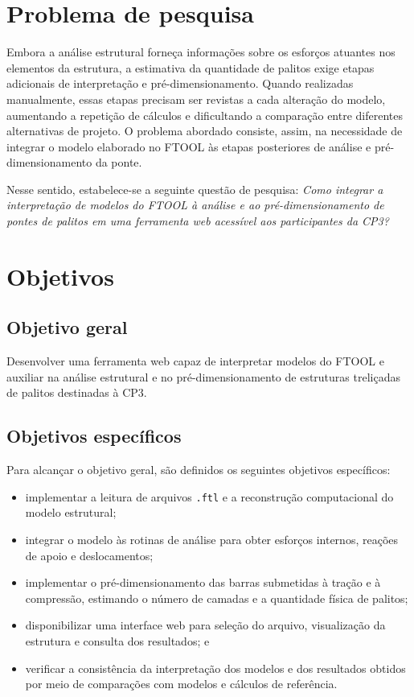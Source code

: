\section{Problema de pesquisa}
\label{sec:problema-pesquisa}

Embora a análise estrutural forneça informações sobre os esforços atuantes nos elementos da estrutura, a estimativa da quantidade de palitos exige etapas adicionais de interpretação e pré-dimensionamento. Quando realizadas manualmente, essas etapas precisam ser revistas a cada alteração do modelo, aumentando a repetição de cálculos e dificultando a comparação entre diferentes alternativas de projeto. O problema abordado consiste, assim, na necessidade de integrar o modelo elaborado no \gls{FTOOL} às etapas posteriores de análise e pré-dimensionamento da ponte.

Nesse sentido, estabelece-se a seguinte questão de pesquisa: \textit{Como integrar a interpretação de modelos do \gls{FTOOL} à análise e ao pré-dimensionamento de pontes de palitos em uma ferramenta web acessível aos participantes da \gls{CP3}?}

\section{Objetivos}
\label{sec:objetivos}

\subsection{Objetivo geral}
\label{subsec:objetivo-geral}

Desenvolver uma ferramenta web capaz de interpretar modelos do \gls{FTOOL} e auxiliar na análise estrutural e no pré-dimensionamento de estruturas treliçadas de palitos destinadas à \gls{CP3}.

\subsection{Objetivos específicos}
\label{subsec:objetivos-especificos}

Para alcançar o objetivo geral, são definidos os seguintes objetivos específicos:

\begin{itemize}
    \item implementar a leitura de arquivos \texttt{.ftl} e a reconstrução computacional do modelo estrutural;
    \item integrar o modelo às rotinas de análise para obter esforços internos, reações de apoio e deslocamentos;
    \item implementar o pré-dimensionamento das barras submetidas à tração e à compressão, estimando o número de camadas e a quantidade física de palitos;
    \item disponibilizar uma interface web para seleção do arquivo, visualização da estrutura e consulta dos resultados; e
    \item verificar a consistência da interpretação dos modelos e dos resultados obtidos por meio de comparações com modelos e cálculos de referência.
\end{itemize}

